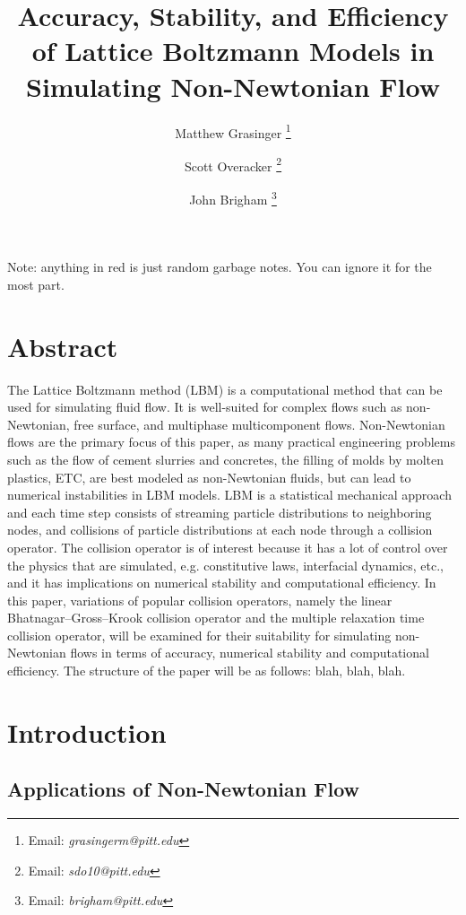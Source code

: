 \documentclass{article}
\title{Accuracy, Stability, and Efficiency of Lattice Boltzmann Models in Simulating Non-Newtonian Flow}
\author{{Matthew Grasinger}
\thanks{Email: \textit{grasingerm@pitt.edu}}}
\author{{Scott Overacker}
	\thanks{Email: \textit{sdo10@pitt.edu}}}
\author{John Brigham
\thanks{Email: \textit{brigham@pitt.edu}}}
\affil{Civil and Environmental Engineering Department, University of Pittsburgh}
\begin{document}
\maketitle
\newpage
\tableofcontents
\newpage
{}

\linenumbers

Note: anything in {\color{red}red} is just random garbage notes.
You can ignore it for the most part.

\section*{Abstract}

The Lattice Boltzmann method (LBM) is a computational method that can be used for simulating fluid flow.
It is well-suited for complex flows such as non-Newtonian, free surface, and multiphase multicomponent flows.
Non-Newtonian flows are the primary focus of this paper, as many practical engineering problems such as the flow of cement slurries and concretes, the filling of molds by molten plastics, ETC, are best modeled as non-Newtonian fluids, but can lead to numerical instabilities in LBM models.
LBM is a statistical mechanical approach and each time step consists of streaming particle distributions to neighboring nodes, and collisions of particle distributions at each node through a collision operator.
The collision operator is of interest because it has a lot of control over the physics that are simulated, e.g. constitutive laws, interfacial dynamics, etc., and it has implications on numerical stability and computational efficiency.
In this paper, variations of popular collision operators, namely the linear Bhatnagar--Gross--Krook collision operator and the multiple relaxation time collision operator, will be examined for their suitability for simulating non-Newtonian flows in terms of accuracy, numerical stability and computational efficiency.
The structure of the paper will be as follows: blah, blah, blah.

\section{Introduction} %

\subsection{Applications of Non-Newtonian Flow}
\end{document}
